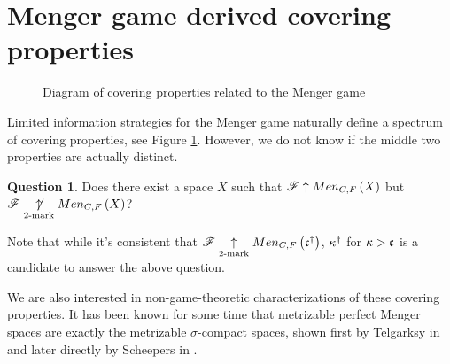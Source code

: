 \documentclass{amsart}
\theoremstyle{definition}
\newtheorem{question}[theorem]{Question}
\begin{document}
\section{Menger game derived covering properties}

\begin{figure}[h]
\begin{center}
\end{center}
\caption{Diagram of covering properties related to the Menger game}
\label{menSpec}
\end{figure}

Limited information strategies for the Menger game naturally define a spectrum
of covering properties, see Figure \ref{menSpec}. However,
we do not know if the middle two properties are actually distinct.

\begin{question}\label{perfectTo2Mark}
  Does there exist a space \(X\) such that \(\mathscr{F} \uparrow Men_{C,F}\left({X}\right)\) but
  \(\mathscr{F} \underset{2\text{-mark}}{\not\uparrow} Men_{C,F}\left({X}\right)\)?
\end{question}

Note that while it's consistent that
\(\mathscr{F}\underset{2\text{-mark}}{\uparrow}Men_{C,F}\left({\mathfrak{c}^\dagger}\right)\), \(\kappa^\dagger\)
for \(\kappa>\mathfrak{c}\) is a candidate to answer the above question.

We are also interested in non-game-theoretic characterizations of these
covering properties. It has been known for some time that metrizable perfect
Menger spaces are exactly the metrizable \(\sigma\)-compact spaces, shown first
by Telgarksy in \cite{MR753073} and later directly by Scheepers in
\cite{MR1273523}.
\end{document}
